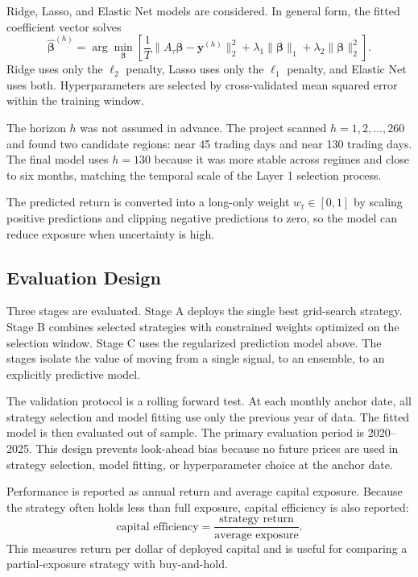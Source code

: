 \documentclass[11pt, letterpaper]{article}
\begin{document}
Ridge, Lasso, and Elastic Net models are considered. In general form, the fitted coefficient vector solves
\[
  \hat{\boldsymbol{\beta}}^{(h)}
  =
  \arg\min_{\boldsymbol{\beta}}
  \left[
    \frac{1}{T}\|A_\tau\boldsymbol{\beta}-\mathbf{y}^{(h)}\|_2^2
    + \lambda_1\|\boldsymbol{\beta}\|_1
    + \lambda_2\|\boldsymbol{\beta}\|_2^2
  \right].
\]
Ridge uses only the $\ell_2$ penalty, Lasso uses only the $\ell_1$ penalty, and Elastic Net uses both. Hyperparameters are selected by cross-validated mean squared error within the training window.

The horizon $h$ was not assumed in advance. The project scanned $h=1,2,\ldots,260$ and found two candidate regions: near 45 trading days and near 130 trading days. The final model uses $h=130$ because it was more stable across regimes and close to six months, matching the temporal scale of the Layer 1 selection process.

The predicted return is converted into a long-only weight $w_t\in[0,1]$ by scaling positive predictions and clipping negative predictions to zero, so the model can reduce exposure when uncertainty is high.

\subsection{Evaluation Design}

Three stages are evaluated. Stage A deploys the single best grid-search strategy. Stage B combines selected strategies with constrained weights optimized on the selection window. Stage C uses the regularized prediction model above. The stages isolate the value of moving from a single signal, to an ensemble, to an explicitly predictive model.

The validation protocol is a rolling forward test. At each monthly anchor date, all strategy selection and model fitting use only the previous year of data. The fitted model is then evaluated out of sample. The primary evaluation period is 2020--2025. This design prevents look-ahead bias because no future prices are used in strategy selection, model fitting, or hyperparameter choice at the anchor date.

Performance is reported as annual return and average capital exposure. Because the strategy often holds less than full exposure, capital efficiency is also reported:
\[
    \text{capital efficiency}
    =
    \frac{\text{strategy return}}{\text{average exposure}}.
\]
This measures return per dollar of deployed capital and is useful for comparing a partial-exposure strategy with buy-and-hold.
\end{document}
